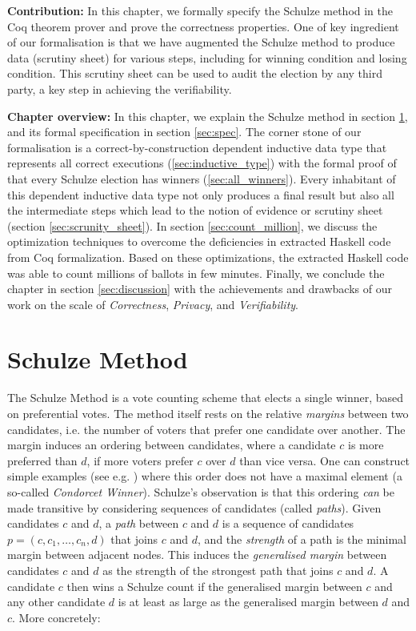  
\textbf{Contribution:} In this chapter,  we formally specify the Schulze method in the Coq theorem prover and 
prove the correctness properties.  One of key ingredient of our formalisation is that we have augmented    
 the Schulze method to produce data (scrutiny sheet) for various steps, including for winning condition and losing condition. 
 This scrutiny sheet can be used to audit the election by any third party,  a key step in achieving 
 the verifiability.   
 
 \textbf{Chapter overview:} In this chapter, we explain the Schulze method in section \ref{sec:schulze_algorithm}, 
 and its formal specification in section \ref{sec:spec}. The  corner stone of our formalisation is 
 a correct-by-construction dependent inductive data type 
 that represents all correct executions (\ref{sec:inductive_type}) with the formal proof of
 that every Schulze election has winners (\ref{sec:all_winners}).  Every inhabitant of 
 this dependent inductive data type not only produces a final result but also all the 
 intermediate steps which lead to the notion of evidence or scrutiny sheet (section 
  \ref{sec:scrunity_sheet}).  In section \ref{sec:count_million}, we discuss the optimization techniques
   to overcome the deficiencies in extracted Haskell code from Coq formalization. Based on 
   these optimizations, the extracted Haskell code was able to count millions of ballots in few 
   minutes. 
   Finally, we conclude the chapter in section \ref{sec:discussion} with 
   the achievements and drawbacks of our work on the scale of \textit{Correctness},
   \textit{Privacy}, and \textit{Verifiability}.
   

 

\section{Schulze Method}
\label{sec:schulze_algorithm}
The Schulze Method \citep{Schulze:2011:NMC} is a vote counting scheme
that elects a single winner, based on preferential votes. 
The method itself rests on the relative 
\emph{margins} between two candidates, i.e. the number of
voters that prefer one candidate over another.  The margin induces
an ordering between candidates, where a candidate $c$ is more
preferred than $d$, if more voters prefer $c$ over $d$ than 
vice versa. One can construct simple examples (see e.g.
\citep{Rivest:2010:OSW}) where this order does not have a maximal
element (a so-called \emph{Condorcet Winner}). Schulze's observation
is that this ordering \emph{can} be made transitive by considering
sequences of candidates (called \emph{paths}). Given candidates $c$
and $d$, a \emph{path} between $c$ and $d$ is a sequence of candidates
 $p = (c, c_1,\dots, c_n, d)$ that joins $c$ and $d$, and 
 the \emph{strength} of a
path is the minimal margin between adjacent nodes. This induces the
\emph{generalised margin} between candidates $c$ and $d$ as the
strength of the strongest path that joins $c$ and $d$. A candidate
$c$ then wins a Schulze count if the generalised margin between $c$
and any other candidate $d$ is at least as large as the generalised
margin between $d$ and $c$. More concretely:

